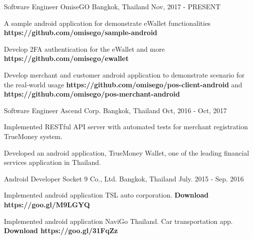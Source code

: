 

\begin{cventries}

  \cventry
    {Software Engineer}
    {OmiseGO}
    {Bangkok, Thailand}
    {Nov, 2017 - PRESENT}
    {
      \begin{cvitems}
        \item {A sample android application for demonstrate eWallet functionalities \textbf{https://github.com/omisego/sample-android}}
        \item {Develop 2FA authentication for the eWallet and more \textbf{https://github.com/omisego/ewallet}}  
        \item {Develop merchant and customer android application to demonstrate scenario for the real-world usage \textbf{https://github.com/omisego/pos-client-android} and \textbf{https://github.com/omisego/pos-merchant-android}}
      \end{cvitems}
    }

  \cventry
    {Software Engineer} %
    {Ascend Corp.} %
    {Bangkok, Thailand} %
    {Oct, 2016 - Oct, 2017} %
    {
      \begin{cvitems} %
        \item {Implemented RESTful API server with automated tests for merchant registration TrueMoney system.}
        \item {Developed an android application, TrueMoney Wallet, one of the leading financial services application in Thailand.}
      \end{cvitems}
    }

  \cventry
    {Android Developer} %
    {Socket 9 Co., Ltd.} %
    {Bangkok, Thailand} %
    {July. 2015 - Sep. 2016} %
    {
      \begin{cvitems} %
        \item {Implemented android application TSL auto corporation. \textbf{Download https://goo.gl/M9LGYQ}}
        \item {Implemented android application NaviGo Thailand. Car transportation app. \textbf{Download https://goo.gl/31FqZz}}
      \end{cvitems}
    }

\end{cventries}
